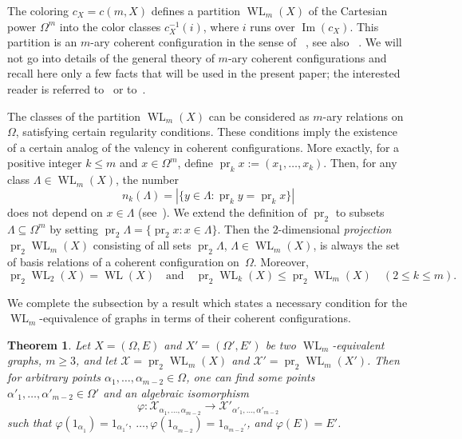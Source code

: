 \documentclass{amsart}
\newcommand{\cal}{\mathcal}
\newtheorem{theorem}[formula]{Theorem}
\def\thrml#1{\begin{theorem}\label{#1}}
\def\ethrm{\end{theorem}}
\def\qtnl#1{\begin{equation}\label{#1}}
\def\eqtn{\end{equation}}
\def\cX{{\cal X}}
\DeclareMathOperator{\im}{Im}
\DeclareMathOperator{\pr}{pr}
\DeclareMathOperator{\WL}{WL}
\def\qaq{\quad\text{and}\quad}
\begin{document}
The coloring $c_X=c(m,X)$ defines a partition $\WL_m(X)$ of the Cartesian power $\Omega^m$ into the color classes $c_X^{-1}(i)$, where $i$ runs over $\im(c_X)$. This partition is an $m$-ary coherent configuration in the sense of
~\cite{Babai2019}, see also ~\cite{AndresHelfgott2017}. We will not go into details of the general theory of $m$-ary coherent configurations and recall here only a few facts that will be used in the present paper; the interested reader is referred to~\cite[Section~3]{Ponomarenko2022a} or to~\cite[Subsection~3.1]{Chen2023}.

The classes of the partition $\WL_m(X)$ can be considered as $m$-ary relations on~$\Omega$, satisfying certain regularity conditions. These conditions imply the existence of a certain analog of the valency in coherent configurations. More exactly, for a positive integer $k\le m$ and $x\in \Omega^m$, define $\pr_k x:=(x_1,\ldots,x_k)$.
Then, for any class  $\Lambda\in \WL_m(X)$, the number 
\qtnl{250623e}
n_k(\Lambda)=|\{y\in \Lambda\colon \pr_k y=\pr_k x\}|
\eqtn
does not depend on $x\in \Lambda$ (see~\cite[Lemma~3.5]{Chen2023}). 
We extend the definition of $\pr_2$ to subsets $\Lambda\subseteq\Omega^m$ by setting $\pr_2 \Lambda=\{\pr_2 x\colon x\in\Lambda\}$. Then  the $2$-dimensional \emph{projection} 
$\pr_2 \WL_m(X)$ consisting of all sets 
$\pr_2 \Lambda$, $\Lambda\in \WL_m(X)$, is always the set of 
basis relations of a coherent configuration on~$\Omega$. 
Moreover,
\qtnl{250623e1}
\pr_2\WL_2(X)=\WL(X) \qaq \pr_2\WL_k(X)\le \pr_2\WL_m(X)\quad (2\le k\le m).
\eqtn

We complete the subsection by a result \cite[Theorem~3.7]{Ponomarenko2022a} which states a necessary condition 
for the $\WL_m$-equivalence of graphs in terms of 
their coherent configurations.

\thrml{080622a}
Let $X=(\Omega,E)$ and $X'=(\Omega',E')$  be two $\WL_m$-equivalent graphs,  $m\ge 3$, and let  $\cX=\pr_2\WL_m(X)$ and $\cX'=\pr_2\WL_m(X')$. Then for arbitrary points $\alpha_1,\ldots,\alpha_{m-2}\in\Omega$, one can find  some points $\alpha'_1,\ldots,\alpha'_{m-2}\in\Omega'$  and  an algebraic isomorphism 
\qtnl{250623w}
\varphi\colon\cX^{}_{\alpha^{}_1,\ldots,\alpha^{}_{m-2}}\to \cX'_{\alpha'_1,\ldots,\alpha'_{m-2}}
\eqtn
such that $\varphi(1_{\alpha_1^{}})=1_{\alpha_1'},\ \ldots, \varphi(1_{\alpha_{m-2}^{}})=1_{\alpha_{m-2}'}$, and $\varphi(E)=E'$. 
\ethrm
\end{document}

